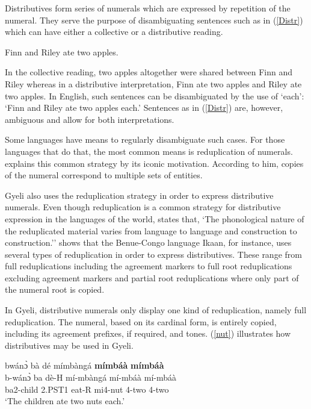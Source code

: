 Distributives form series of numerals which are expressed by repetition of the numeral. They serve the purpose of disambiguating sentences such as in (\ref{Distr}) which can have either a collective or a distributive reading.

\begin{exe}
\ex\label{Distr}
 Finn and Riley ate two apples.
\end{exe}

\noindent In the collective reading, two apples altogether were shared between Finn and Riley whereas in a distributive interpretation, Finn ate two apples and Riley ate two apples. In English, such sentences can be disambiguated by the use of `each': `Finn and Riley ate two apples each.' Sentences as in (\ref{Distr}) are, however, ambiguous and allow for both interpretations.

Some languages have means to regularly disambiguate such cases. For those languages that do that, the most common means is reduplication of numerals. \citet[4]{gil05} explains this common strategy by its iconic motivation. According to him, copies of the numeral correspond to multiple sets of entities.

Gyeli also uses the reduplication strategy in order to express distributive numerals. Even though reduplication is a common strategy for distributive expression in the languages of the world, \citet[3]{rubino05} states that, `The phonological nature of the reduplicated material varies from language to language and construction to construction.''  \citet[118]{borchardt11} shows that the Benue-Congo language Ikaan, for instance, uses several types of reduplication in order to express distributives. These range from full reduplications including the agreement markers to full root reduplications excluding agreement markers and partial root reduplications where only part of the numeral root is copied. 

In Gyeli, distributive numerals only display one kind of reduplication, namely full reduplication. The numeral, based on its cardinal form, is entirely copied, including its agreement prefixes, if required, and tones. (\ref{nut}) illustrates how distributives may be used in Gyeli.

\begin{exe}
\ex\label{nut}
  \glll   bwánɔ̀ bà dé mímbàngá {\bfseries mímbáà} {\bfseries mímbáà}\\
         b-wánɔ̀ ba dè-H mí-mbàngá mí-mbáà mí-mbáà\\
                ba2-child 2.PST1 eat-R mi4-nut 4-two 4-two \\
    \trans `The children ate two nuts each.'
\end{exe}

